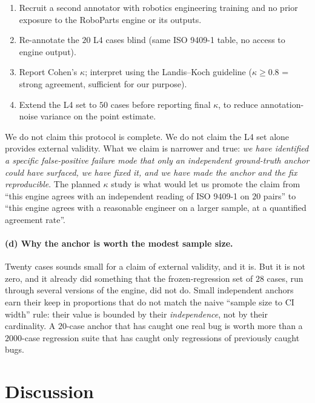 \documentclass[review]{elsarticle}
\begin{document}
\begin{enumerate}[nosep]
\item Recruit a second annotator with robotics engineering training
and no prior exposure to the RoboParts engine or its outputs.
\item Re-annotate the $20$ L4 cases blind (same ISO 9409-1 table,
no access to engine output).
\item Report Cohen's $\kappa$; interpret using the Landis--Koch
guideline ($\kappa \geq 0.8$ = strong agreement, sufficient for our
purpose).
\item Extend the L4 set to $50$ cases before reporting final
$\kappa$, to reduce annotation-noise variance on the point estimate.
\end{enumerate}

We do not claim this protocol is complete. We do not claim the L4
set alone provides external validity. What we claim is narrower and
true: \emph{we have identified a specific false-positive failure mode
that only an independent ground-truth anchor could have surfaced,
we have fixed it, and we have made the anchor and the fix
reproducible}. The planned $\kappa$ study is what would let us
promote the claim from ``this engine agrees with an independent
reading of ISO 9409-1 on $20$ pairs'' to ``this engine agrees with a
reasonable engineer on a larger sample, at a quantified agreement
rate''.

\paragraph{(d) Why the anchor is worth the modest sample size.}
Twenty cases sounds small for a claim of external validity, and it
is. But it is not zero, and it already did something that the
frozen-regression set of $28$ cases, run through several versions of
the engine, did not do. Small independent anchors earn their keep in
proportions that do not match the naive ``sample size to CI width''
rule: their value is bounded by their \emph{independence}, not by
their cardinality. A $20$-case anchor that has caught one real bug is
worth more than a $2000$-case regression suite that has caught only
regressions of previously caught bugs.

\section{Discussion}
\end{document}
